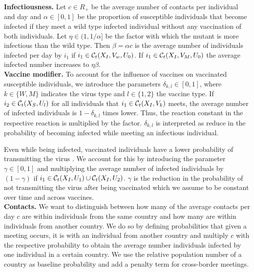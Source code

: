 \textbf{Infectiousness.} Let $c \in R_+$ be the average number of contacts per individual and day and $\alpha \in [0,1]$ be the proportion of susceptible individuals that become infected if they meet a wild type infected individual without any vaccination of both individuals. Let $\eta \in (1, 1/\alpha]$ be the factor with which the mutant is more infectious than the wild type. Then $\beta = \alpha c$ is the average number of individuals infected per day by $i_1$ if $i_1 \in \mathcal{C}_t(X_I, V_w, U_0)$. If $i_1 \in \mathcal{C}_t(X_I, V_M, U_0)$ the average infected number increases to $\eta \beta$. \\

\textbf{Vaccine modifier.}
To account for the influence of vaccines on vaccinated susceptible individuals, we introduce the parameters $\delta_{k,l} \in [0,1]$, where $k \in \{W, M\}$ indicates the virus type and $l \in \{ 1,2\}$ the vaccine type. If $i_2 \in \mathcal{C}_t(X_S, U_l) $ for all individuals that $i_1 \in \mathcal{C}_t(X_I, V_k)$ meets, the average number of infected individuals is $1 - \delta_{k,l}$ times lower. Thus, the reaction constant in the respective reaction is multiplied by the factor. $\delta_{k,l}$ is interpreted as reduce in the probability of becoming infected while meeting an infectious individual.

Even while being infected, vaccinated individuals have a lower probability of transmitting the virus \citep{Harris.2021}. We account for this by introducing the parameter $\gamma \in [0,1]$ and multiplying the average number of infected individuals by $(1 - \gamma)$ if $i_1 \in \mathcal{C}_t(X_I, U_1) \cup \mathcal{C}_t(X_I, U_2)$. $\gamma$ is the reduction in the probability of not transmitting the virus after being vaccinated which we assume to be constant over time and across vaccines. \\

\textbf{Contacts.}
We want to distinguish between how many of the average contacts per day $c$ are within individuals from the same country and how many are within individuals from another country. We do so by defining probabilities that given a meeting occurs, it is with an individual from another country and multiply $c$ with the respective probability to obtain the average number individuals infected by one individual in a certain country. We use the relative population number of a country as baseline probability and add a penalty term for cross-border meetings. \\

